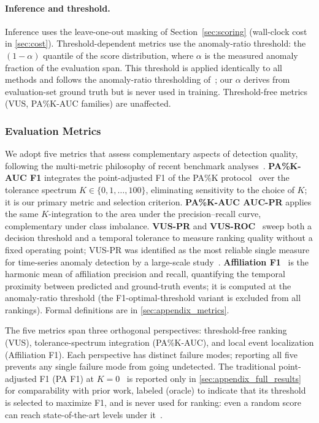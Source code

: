 \paragraph{Inference and threshold.}
Inference uses the leave-one-out masking of Section~\ref{sec:scoring} (wall-clock cost in
\ref{sec:cost}).
Threshold-dependent metrics use the anomaly-ratio threshold: the $(1-\alpha)$ quantile of the
score distribution, where $\alpha$ is the measured anomaly fraction of the evaluation span.
This threshold is applied identically to all methods and follows the anomaly-ratio thresholding
of~\cite{xu2022anomalytransformer}; our $\alpha$ derives from evaluation-set ground truth but is
never used in training.
Threshold-free metrics (VUS, PA\%K-AUC families) are unaffected.

\subsubsection{Evaluation Metrics}
\label{sec:metrics}

We adopt five metrics that assess complementary aspects of detection quality, following the
multi-metric philosophy of recent benchmark
analyses~\cite{kim2022rigorous,paparrizos2022vus,liu2024elephant,wang2025nrdetector}.
\textbf{PA\%K-AUC F1} integrates the point-adjusted F1 of the PA\%K
protocol~\cite{kim2022rigorous} over the tolerance spectrum $K \in \{0,1,\ldots,100\}$,
eliminating sensitivity to the choice of $K$; it is our primary metric and selection criterion.
\textbf{PA\%K-AUC AUC-PR} applies the same $K$-integration to the area under the
precision--recall curve, complementary under class imbalance.
\textbf{VUS-PR} and \textbf{VUS-ROC}~\cite{paparrizos2022vus} sweep both a decision threshold
and a temporal tolerance to measure ranking quality without a fixed operating point; VUS-PR was
identified as the most reliable single measure for time-series anomaly detection by a large-scale
study~\cite{liu2024elephant}.
\textbf{Affiliation F1}~\cite{huet2022affiliation} is the harmonic mean of affiliation precision
and recall, quantifying the temporal proximity between predicted and ground-truth events; it is
computed at the anomaly-ratio threshold (the F1-optimal-threshold variant is excluded from all
rankings).
Formal definitions are in \ref{sec:appendix_metrics}.

The five metrics span three orthogonal perspectives: threshold-free ranking (VUS),
tolerance-spectrum integration (PA\%K-AUC), and local event localization (Affiliation F1).
Each perspective has distinct failure modes; reporting all five prevents any single failure mode
from going undetected.
The traditional point-adjusted F1 (PA F1) at $K{=}0$~\cite{xu2018kpivae} is reported only in
\ref{sec:appendix_full_results} for comparability with prior work, labeled (oracle) to
indicate that its threshold is selected to maximize F1, and is never used for ranking: even a
random score can reach state-of-the-art levels under it~\cite{kim2022rigorous}.

